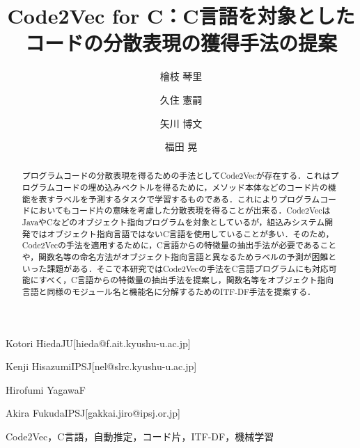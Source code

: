 \documentclass[submit]{ipsj}
\begin{document}
\title{Code2Vec for C：C言語を対象としたコードの分散表現の獲得手法の提案}




\author{檜枝 琴里}{Kotori Hieda}{JU}[hieda@f.ait.kyushu-u.ac.jp]
\author{久住 憲嗣}{Kenji Hisazumi}{IPSJ}[nel@slrc.kyushu-u.ac.jp]
\author{矢川 博文}{Hirofumi Yagawa}{F}
\author{福田 晃}{Akira Fukuda}{IPSJ}[gakkai.jiro@ipsj.or.jp]

\begin{abstract}
プログラムコードの分散表現を得るための手法としてCode2Vecが存在する．これはプログラムコードの埋め込みベクトルを得るために，メソッド本体などのコード片の機能を表すラベルを予測するタスクで学習するものである．これによりプログラムコードにおいてもコード片の意味を考慮した分散表現を得ることが出来る．Code2VecはJavaやCなどのオブジェクト指向プログラムを対象としているが，組込みシステム開発ではオブジェクト指向言語ではないC言語を使用していることが多い．そのため，Code2Vecの手法を適用するために，C言語からの特徴量の抽出手法が必要であることや，関数名等の命名方法がオブジェクト指向言語と異なるためラベルの予測が困難といった課題がある．そこで本研究ではCode2Vecの手法をC言語プログラムにも対応可能にすべく，C言語からの特徴量の抽出手法を提案し，関数名等をオブジェクト指向言語と同様のモジュール名と機能名に分解するためのITF-DF手法を提案する．
\end{abstract}


\begin{jkeyword}
Code2Vec，C言語，自動推定，コード片，ITF-DF，機械学習
\end{jkeyword}


\maketitle

\end{document}
